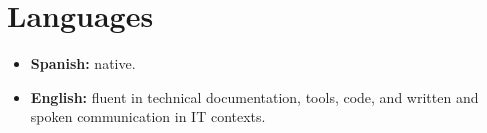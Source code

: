 \section{Languages}

\begin{itemize}
  \item \textbf{Spanish:} native.
  \item \textbf{English:} fluent in technical documentation, tools, code, and written and spoken communication in IT contexts.
\end{itemize}
